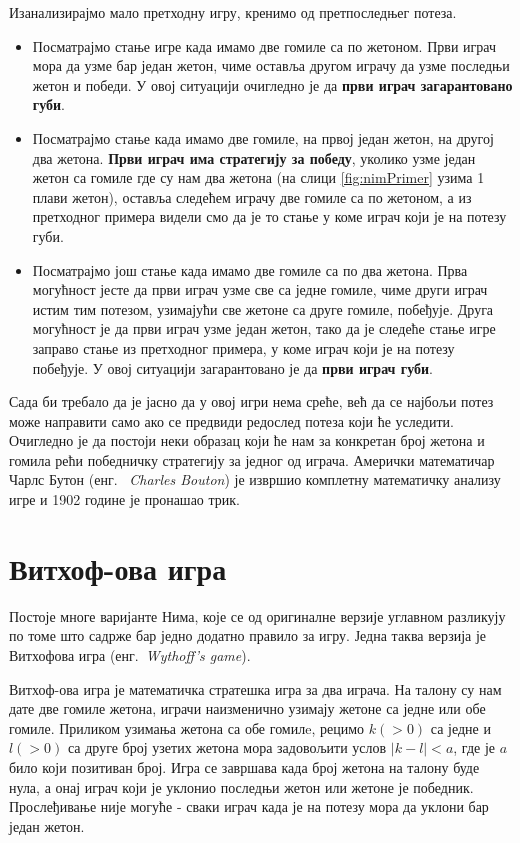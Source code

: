 \documentclass[a4paper]{article}
\begin{document}
Изанализирајмо мало претходну игру, кренимо од претпоследњег потеза. 
\begin{itemize}
	\item Посматрајмо стање игре када имамо две гомиле са по жетоном. Први играч мора да узме бар један жетон, чиме оставља другом играчу да узме последњи жетон и победи. У овој ситуацији очигледно је да \textbf{први играч загарантовано губи}.
	
	\item Посматрајмо стање када имамо две гомиле, на првој један жетон, на другој два жетона. \textbf{Први играч има стратегију за победу}, уколико узме један жетон са гомиле где су нам два жетона (на слици \ref{fig:nimPrimer} узима 1 плави жетон), оставља следећем играчу две гомиле са по жетоном, а из претходног примера видели смо да је то стање у коме играч који је на потезу губи.
	
	\item Посматрајмо још стање када имамо две гомиле са по два жетона. Прва могућност јесте да први играч узме све са једне гомиле, чиме други играч истим тим потезом, узимајући све жетоне са друге гомиле, побеђује. Друга могућност је да први играч узме један жетон, тако да је следеће стање игре заправо стање из претходног примера, у коме играч који је на потезу побеђује. У овој ситуацији загарантовано је да \textbf{први играч губи}.
\end{itemize}

Сада би требало да је јасно да у овој игри нема среће, већ да се најбољи потез може направити само ако се предвиди редослед потеза који ће уследити. Очигледно је да постоји неки образац који ће нам за конкретан број жетона и гомила рећи победничку стратегију за једног од играча. Амерички математичар Чарлс Бутон (енг. {~\em Charles Bouton}) је извршио комплетну математичку анализу игре и 1902 године је пронашао трик. \cite{10.2307/1967631}

\section{Витхоф-ова игра}
\label{sec:vithofova_igra}

Постоје многе варијанте Нима, које се од оригиналне верзије углавном разликују по томе што садрже бар једно додатно правило за игру. Једна таква верзија је Витхофова игра (енг.{~\em Wythoff's game})\cite{10.2307/2321643}.

Витхоф-ова игра је математичка стратешка игра за два играча. На талону су нам дате две гомиле жетона, играчи наизменично узимају жетоне са једне или обе гомиле. Приликом узимања жетона са обе гомилe, рецимо $ k (> 0) $ са једне и $ l (> 0) $ са друге број узетих жетона мора задовољити услов $ |k - l| < a $, где је $ a $ било који позитиван број. Игра се завршава када број жетона на талону буде нула, а онај играч који је уклонио последњи жетон или жетоне је победник. Прослеђивање није могуће - сваки играч када је на потезу мора да уклони бар један жетон.
\end{document}
